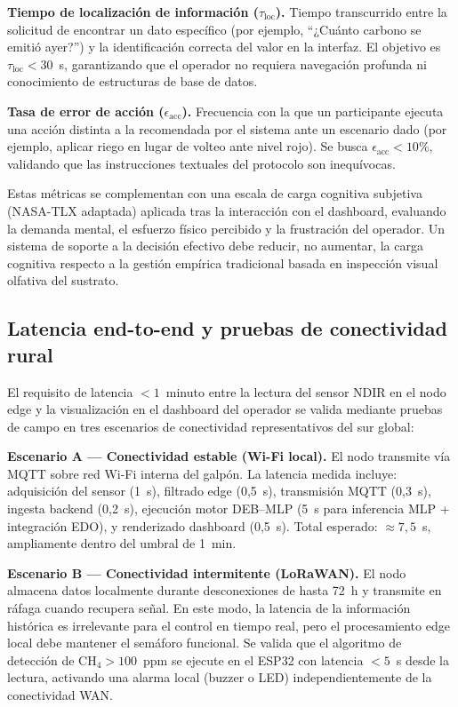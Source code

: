 \textbf{Tiempo de localización de información ($\tau_{\mathrm{loc}}$).} Tiempo transcurrido entre la solicitud de encontrar un dato específico (por ejemplo, ``¿Cuánto carbono se emitió ayer?'') y la identificación correcta del valor en la interfaz. El objetivo es $\tau_{\mathrm{loc}} < 30$~s, garantizando que el operador no requiera navegación profunda ni conocimiento de estructuras de base de datos.

\textbf{Tasa de error de acción ($\epsilon_{\mathrm{acc}}$).} Frecuencia con la que un participante ejecuta una acción distinta a la recomendada por el sistema ante un escenario dado (por ejemplo, aplicar riego en lugar de volteo ante nivel rojo). Se busca $\epsilon_{\mathrm{acc}} < 10$\%, validando que las instrucciones textuales del protocolo son inequívocas.

Estas métricas se complementan con una escala de carga cognitiva subjetiva (NASA-TLX adaptada) aplicada tras la interacción con el dashboard, evaluando la demanda mental, el esfuerzo físico percibido y la frustración del operador. Un sistema de soporte a la decisión efectivo debe reducir, no aumentar, la carga cognitiva respecto a la gestión empírica tradicional basada en inspección visual olfativa del sustrato.

\subsection{Latencia end-to-end y pruebas de conectividad rural}
\label{subsec:cap5_latencia}

El requisito de latencia $< 1$~minuto entre la lectura del sensor NDIR en el nodo edge y la visualización en el dashboard del operador se valida mediante pruebas de campo en tres escenarios de conectividad representativos del sur global:

\textbf{Escenario A --- Conectividad estable (Wi-Fi local).} El nodo transmite vía MQTT sobre red Wi-Fi interna del galpón. La latencia medida incluye: adquisición del sensor (1~s), filtrado edge (0{,}5~s), transmisión MQTT (0{,}3~s), ingesta backend (0{,}2~s), ejecución motor DEB--MLP (5~s para inferencia MLP + integración EDO), y renderizado dashboard (0{,}5~s). Total esperado: $\approx 7{,}5$~s, ampliamente dentro del umbral de 1~min.

\textbf{Escenario B --- Conectividad intermitente (LoRaWAN).} El nodo almacena datos localmente durante desconexiones de hasta 72~h y transmite en ráfaga cuando recupera señal. En este modo, la latencia de la información histórica es irrelevante para el control en tiempo real, pero el procesamiento edge local debe mantener el semáforo funcional. Se valida que el algoritmo de detección de CH$_4 > 100$~ppm se ejecute en el ESP32 con latencia $< 5$~s desde la lectura, activando una alarma local (buzzer o LED) independientemente de la conectividad WAN.

